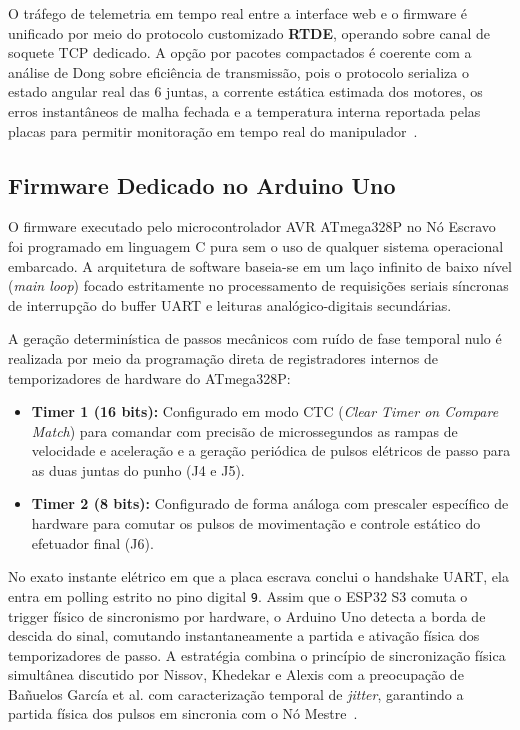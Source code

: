 O tráfego de telemetria em tempo real entre a interface web e o firmware é unificado por meio do protocolo customizado \textbf{RTDE}, operando sobre canal de soquete TCP dedicado. A opção por pacotes compactados é coerente com a análise de Dong sobre eficiência de transmissão, pois o protocolo serializa o estado angular real das 6 juntas, a corrente estática estimada dos motores, os erros instantâneos de malha fechada e a temperatura interna reportada pelas placas para permitir monitoração em tempo real do manipulador~\cite{dong2022comparative}.

\subsection{Firmware Dedicado no Arduino Uno}
\label{subsec:bare_metal_escravo}

O firmware executado pelo microcontrolador AVR ATmega328P no Nó Escravo foi programado em linguagem C pura sem o uso de qualquer sistema operacional embarcado. A arquitetura de software baseia-se em um laço infinito de baixo nível (\textit{main loop}) focado estritamente no processamento de requisições seriais síncronas de interrupção do buffer UART e leituras analógico-digitais secundárias.

A geração determinística de passos mecânicos com ruído de fase temporal nulo é realizada por meio da programação direta de registradores internos de temporizadores de hardware do ATmega328P:
\begin{itemize}
    \item \textbf{Timer 1 (16 bits):} Configurado em modo CTC (\textit{Clear Timer on Compare Match}) para comandar com precisão de microssegundos as rampas de velocidade e aceleração e a geração periódica de pulsos elétricos de passo para as duas juntas do punho (J4 e J5).
    \item \textbf{Timer 2 (8 bits):} Configurado de forma análoga com prescaler específico de hardware para comutar os pulsos de movimentação e controle estático do efetuador final (J6).
\end{itemize}

No exato instante elétrico em que a placa escrava conclui o handshake UART, ela entra em polling estrito no pino digital \texttt{9}. Assim que o ESP32 S3 comuta o trigger físico de sincronismo por hardware, o Arduino Uno detecta a borda de descida do sinal, comutando instantaneamente a partida e ativação física dos temporizadores de passo. A estratégia combina o princípio de sincronização física simultânea discutido por Nissov, Khedekar e Alexis com a preocupação de Bañuelos García et al. com caracterização temporal de \textit{jitter}, garantindo a partida física dos pulsos em sincronia com o Nó Mestre~\cite{nissov2025simultaneous, banuelos2026timing}.

